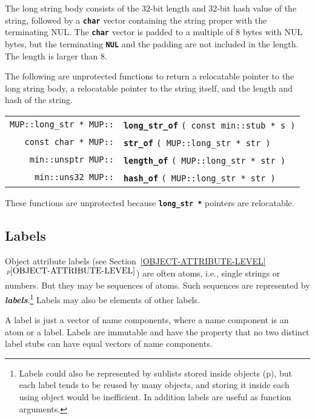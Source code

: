 \documentclass[12pt]{article}
\makeatletter
\newcommand{\TT}[1]{{\tt \bfseries #1}}
\newcommand{\skey}[2]{{\bf \em #1#2}\index{#1}}
\newcommand{\ttindex}[1]{\index{#1@{\tt #1}}}
\newcommand{\itemref}[1]{\ref{#1}$\,^{p\pageref{#1}}$}
\newcommand{\pagref}[1]{p\pageref{#1}}
\newenvironment{indpar}[1][0.3in]%
	{\begin{list}{}%
		     {\setlength{\itemsep}{0in}%
		      \setlength{\topsep}{0in}%
		      \setlength{\parsep}{1ex}%
		      \setlength{\labelwidth}{#1}%
		      \setlength{\leftmargin}{#1}%
		      \addtolength{\leftmargin}{\labelsep}}%
	 \item}%
	{\end{list}}
\newcommand{\LABEL}[1]{\label{#1}}
\newcommand{\MUPKEY}[1]%
	   {\TT{#1}\ttindex{MUP::#1}\ttindex{#1}}
\makeatother
\begin{document}
The long string body consists of the 32-bit length and 32-bit hash value
of the string, followed by a \TT{char}
vector containing the string proper with the terminating NUL.  The
\TT{char} vector is padded to a multiple of 8 bytes with NUL
bytes, but the terminating \TT{NUL} and the padding are not included
in the length.  The length is larger than 8.

The following are unprotected functions to return a relocatable pointer to the
long string body, a relocatable pointer to the string itself,
and the length and hash of the string.

\begin{indpar}\begin{tabular}{r@{}l}
\verb|MUP::long_str * MUP::|
    & \MUPKEY{long\_str\_of} \verb|( const min::stub * s )|
\LABEL{MUP::LONG_STR_OF} \\
\verb|const char * MUP::| & \MUPKEY{str\_of} \verb|( MUP::long_str * str )|
\LABEL{MUP::STR_OF_LONG_STR} \\
\verb|min::unsptr MUP::| & \MUPKEY{length\_of} \verb|( MUP::long_str * str )|
\LABEL{MUP::LENGTH_OF_LONG_STR} \\
\verb|min::uns32 MUP::| & \MUPKEY{hash\_of} \verb|( MUP::long_str * str )|
\LABEL{MUP::HASH_OF_LONG_STR} \\
\end{tabular}\end{indpar}

These functions are unprotected because \TT{long\_str *} pointers
are relocatable.


\subsection{Labels}
\label{LABELS}

Object attribute labels
(see Section~\itemref{OBJECT-ATTRIBUTE-LEVEL})
are often atoms, i.e., single strings or numbers.
But they may be sequences of atoms.  Such sequences are represented by
\skey{label}s.\footnote{Labels could also be represented by
sublists stored inside objects (\pagref{LIST-LEVEL}), but each label tends to
be reused by many objects, and storing it inside each using object
would be inefficient.  In addition labels are useful as function arguments.}
Labels may also be elements of other labels.

A label is just a vector of name components, where a name
component is an atom or a label.  Labels are immutable and
have the property that no two distinct label stubs can have equal vectors of
name components.  
\end{document}
